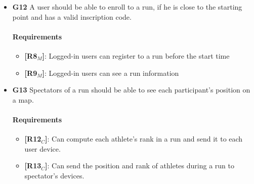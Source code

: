 \begin{itemize}
   
    \item \textbf{G12} A user should be able to enroll to a run, if he is close to the starting point and has a valid inscription code.
    \paragraph{Requirements}
   \begin{itemize}
    \item \textbf{[R8$_M$]}: Logged-in users can register to a run before the start time
    \item \textbf{[R9$_M$]}: Logged-in users can see a run information
   \end{itemize}

   
   
    \item \textbf{G13} Spectators of a run should be able to see each participant's position on a map.
    \paragraph{Requirements}
   \begin{itemize}
    \item \textbf{[R12$_C$]}: Can compute each athlete's rank in a run and send it to each user device.
    \item \textbf{[R13$_C$]}: Can send the position and rank of athletes during a run to spectator's devices.
   \end{itemize}
   \end{itemize}